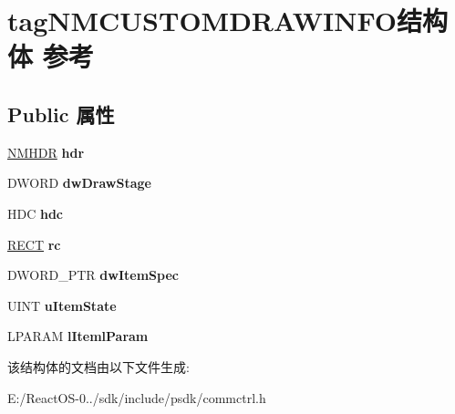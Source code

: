 \hypertarget{structtag_n_m_c_u_s_t_o_m_d_r_a_w_i_n_f_o}{}\section{tag\+N\+M\+C\+U\+S\+T\+O\+M\+D\+R\+A\+W\+I\+N\+F\+O结构体 参考}
\label{structtag_n_m_c_u_s_t_o_m_d_r_a_w_i_n_f_o}
\subsection*{Public 属性}
\begin{DoxyCompactItemize}
\item 
\mbox{\label{structtag_n_m_c_u_s_t_o_m_d_r_a_w_i_n_f_o_a100c75e2f43b775620c97aaf775ba57e}} 
\hyperlink{structtag_n_m_h_d_r}{N\+M\+H\+DR} {\bfseries hdr}
\item 
\mbox{\label{structtag_n_m_c_u_s_t_o_m_d_r_a_w_i_n_f_o_a793e1dfd5af33277edcbe7dddda794ff}} 
D\+W\+O\+RD {\bfseries dw\+Draw\+Stage}
\item 
\mbox{\label{structtag_n_m_c_u_s_t_o_m_d_r_a_w_i_n_f_o_ad5415bac8c17a75532b424a216108657}} 
H\+DC {\bfseries hdc}
\item 
\mbox{\label{structtag_n_m_c_u_s_t_o_m_d_r_a_w_i_n_f_o_a1b00e98dbfd41b1c1d689445525f3114}} 
\hyperlink{structtag_r_e_c_t}{R\+E\+CT} {\bfseries rc}
\item 
\mbox{\label{structtag_n_m_c_u_s_t_o_m_d_r_a_w_i_n_f_o_a24e1e414eb50f83a3274d900fbb43dce}} 
D\+W\+O\+R\+D\+\_\+\+P\+TR {\bfseries dw\+Item\+Spec}
\item 
\mbox{\label{structtag_n_m_c_u_s_t_o_m_d_r_a_w_i_n_f_o_a54047a50f1345fee7139711302668dda}} 
U\+I\+NT {\bfseries u\+Item\+State}
\item 
\mbox{\label{structtag_n_m_c_u_s_t_o_m_d_r_a_w_i_n_f_o_aa5672b23db5e76347e46279e1f8a6e3f}} 
L\+P\+A\+R\+AM {\bfseries l\+Iteml\+Param}
\end{DoxyCompactItemize}


该结构体的文档由以下文件生成\+:\begin{DoxyCompactItemize}
\item 
E\+:/\+React\+O\+S-\/0../sdk/include/psdk/commctrl.\+h\end{DoxyCompactItemize}
